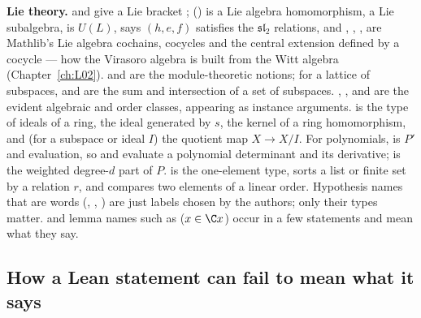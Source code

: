 \textbf{Lie theory.}  and  give a Lie bracket ;
 () is a Lie algebra homomorphism,  a Lie
subalgebra,  is $U(L)$,  says $(h,e,f)$
satisfies the $\mathfrak{sl}_2$ relations, and , , ,
 are Mathlib's Lie algebra cochains, cocycles and the central extension
defined by a cocycle --- how the Virasoro algebra is built from the Witt algebra (Chapter~\ref{ch:L02}).
 and  are the module-theoretic notions; for a lattice
of subspaces,  and  are the sum and intersection of a set of subspaces.
, ,  and  are the evident
algebraic and order classes, appearing as instance arguments.  is the type of ideals of a
ring,  the ideal generated by $s$,  the kernel of a ring
homomorphism, and  (for a subspace or ideal $I$) the quotient map $X\to X/I$. For
polynomials,  is $P'$ and  evaluation, so  and
 evaluate a polynomial determinant and its derivative;  is the weighted
degree-$d$ part of $P$.  is the one-element type,  sorts a list or finite set
by a relation $r$, and  compares two elements of a linear order. Hypothesis names that are
words (, , ) are just labels chosen by the authors; only their types
matter.  and lemma names such as
 ($x\in\C x$) occur in a few statements and mean what they say.

\subsection{How a Lean statement can fail to mean what it says}\label{ch01:sec:failures}

